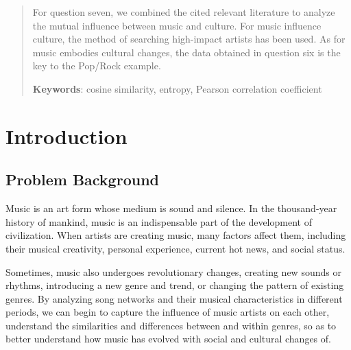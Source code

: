 \documentclass[12pt]{article}  %
\begin{document}
\begin{abstract}
For question seven, we combined the cited relevant literature to analyze the mutual influence between music and culture. For music influence culture, the method of searching high-impact artists has been used. As for music embodies cultural changes, the data obtained in question six is the key to the Pop/Rock example.

    \vspace{5pt}
    \textbf{Keywords}: cosine similarity, entropy, Pearson correlation coefficient

\end{abstract}

\maketitle  %
\tableofcontents  %

\newpage

\section{Introduction}
\subsection{Problem Background}
Music is an art form whose medium is sound and silence.\cite{noauthor_music_nodate} In the thousand-year history of mankind, music is an indispensable part of the development of civilization. When artists are creating music, many factors affect them, including their musical creativity, personal experience, current hot news, and social status.\par
Sometimes, music also undergoes revolutionary changes, creating new sounds or rhythms, introducing a new genre and trend, or changing the pattern of existing genres. By analyzing song networks and their musical characteristics in different periods, we can begin to capture the influence of music artists on each other, understand the similarities and differences between and within genres, so as to better understand how music has evolved with social and cultural changes of. 
\end{document}
